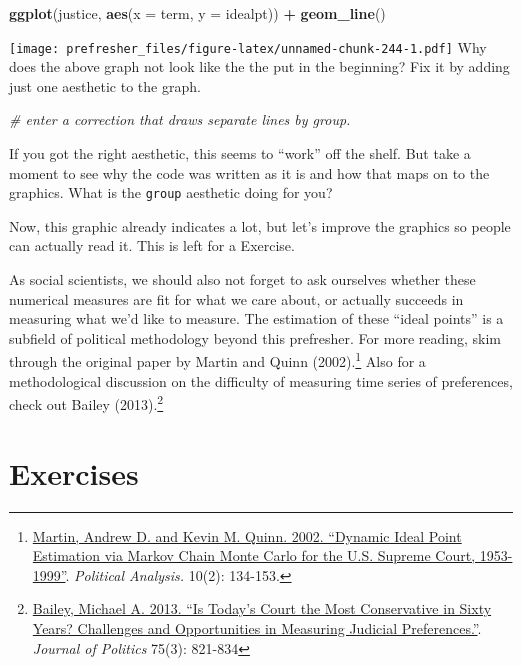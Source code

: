 \documentclass[]{book}
\newenvironment{Shaded}{\begin{snugshade}}{\end{snugshade}}
\newcommand{\KeywordTok}[1]{\textcolor[rgb]{0.13,0.29,0.53}{\textbf{#1}}}
\newcommand{\DataTypeTok}[1]{\textcolor[rgb]{0.13,0.29,0.53}{#1}}
\newcommand{\StringTok}[1]{\textcolor[rgb]{0.31,0.60,0.02}{#1}}
\newcommand{\CommentTok}[1]{\textcolor[rgb]{0.56,0.35,0.01}{\textit{#1}}}
\newcommand{\OperatorTok}[1]{\textcolor[rgb]{0.81,0.36,0.00}{\textbf{#1}}}
\newcommand{\NormalTok}[1]{#1}
\let\rmarkdownfootnote\footnote%
\def\footnote{\protect\rmarkdownfootnote}
\theoremstyle{definition}
\theoremstyle{definition}
\theoremstyle{definition}
\theoremstyle{remark}
\begin{document}
\begin{Shaded}
\begin{Highlighting}[]
\KeywordTok{ggplot}\NormalTok{(justice, }\KeywordTok{aes}\NormalTok{(}\DataTypeTok{x =}\NormalTok{ term, }\DataTypeTok{y =}\NormalTok{ idealpt)) }\OperatorTok{+}
\StringTok{  }\KeywordTok{geom_line}\NormalTok{()}
\end{Highlighting}
\end{Shaded}

\texttt{[image: prefresher\_files/figure-latex/unnamed-chunk-244-1.pdf]}
Why does the above graph not look like the the put in the beginning? Fix
it by adding just one aesthetic to the graph.

\begin{Shaded}
\begin{Highlighting}[]
\CommentTok{# enter a correction that draws separate lines by group.}
\end{Highlighting}
\end{Shaded}

If you got the right aesthetic, this seems to ``work'' off the shelf.
But take a moment to see why the code was written as it is and how that
maps on to the graphics. What is the \texttt{group} aesthetic doing for
you?

Now, this graphic already indicates a lot, but let's improve the
graphics so people can actually read it. This is left for a Exercise.

As social scientists, we should also not forget to ask ourselves whether
these numerical measures are fit for what we care about, or actually
succeeds in measuring what we'd like to measure. The estimation of these
``ideal points'' is a subfield of political methodology beyond this
prefresher. For more reading, skim through the original paper by Martin
and Quinn (2002).\footnote{\href{http://mqscores.lsa.umich.edu/media/pa02.pdf}{Martin,
  Andrew D. and Kevin M. Quinn. 2002. ``Dynamic Ideal Point Estimation
  via Markov Chain Monte Carlo for the U.S. Supreme Court, 1953-1999''}.
  \emph{Political Analysis.} 10(2): 134-153.} Also for a methodological
discussion on the difficulty of measuring time series of preferences,
check out Bailey (2013).\footnote{\href{https://michaelbailey.georgetown.domains/wp-content/uploads/2018/05/JOP_proofs_June2013.pdf}{Bailey,
  Michael A. 2013. ``Is Today's Court the Most Conservative in Sixty
  Years? Challenges and Opportunities in Measuring Judicial
  Preferences.''}. \emph{Journal of Politics} 75(3): 821-834}

\section*{Exercises}\label{exercises-3}
\end{document}

